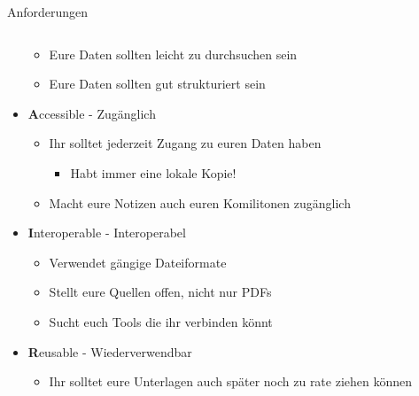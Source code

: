 \begin{frame}{Anforderungen}
\begin{columns}[t]
\begin{column}[t]{0.69\textwidth}
\begin{itemize}
                \begin{itemize}
                    \item Eure Daten sollten leicht zu durchsuchen sein
                    \item Eure Daten sollten gut strukturiert sein
                \end{itemize}
                \item[] \textbf{A}ccessible - Zugänglich
                \begin{itemize}
                    \item Ihr solltet jederzeit Zugang zu euren Daten haben
                    \begin{itemize}
                        \item Habt immer eine lokale Kopie!
                    \end{itemize}
                \item Macht eure Notizen auch euren Komilitonen zugänglich
            \end{itemize}
                \item[] \textbf{I}nteroperable - Interoperabel
                \begin{itemize}
                    \item Verwendet gängige Dateiformate
                    \item Stellt eure Quellen offen, nicht nur PDFs
                    \item Sucht euch Tools die ihr verbinden könnt
                \end{itemize}
                \item[] \textbf{R}eusable - Wiederverwendbar
                \begin{itemize}
                    \item Ihr solltet eure Unterlagen auch später noch zu rate ziehen können
                \end{itemize}
            \end{itemize}
        \end{column}
    \end{columns}  
\end{frame}

